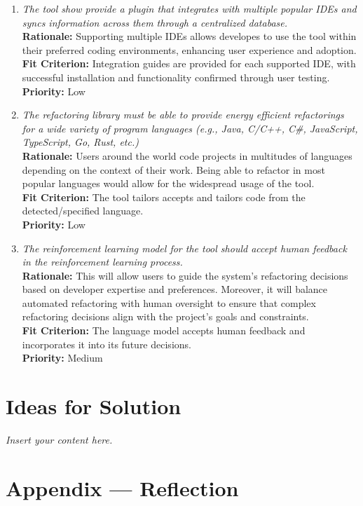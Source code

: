 \documentclass[12pt]{article}
\newcommand{\lips}{\textit{Insert your content here.}}
\begin{document}
\begin{enumerate}[label=WTRM \arabic*., wide=0pt, leftmargin=*]
    {\bf Priority:} High
  \item \emph{The tool show provide a plugin that integrates with multiple popular IDEs and syncs information across them through a centralized database.}\\
    {\bf Rationale:} Supporting multiple IDEs allows developes to use the tool within their preferred coding environments, enhancing user experience and adoption.\\
    {\bf Fit Criterion:} Integration guides are provided for each supported IDE, with successful installation and functionality confirmed through user testing.\\
    {\bf Priority:} Low
  \item \emph{The refactoring library must be able to provide energy efficient refactorings for a wide variety of program languages (e.g., Java, C/C++, C\#, JavaScript, TypeScript, Go, Rust, etc.)}\\
    {\bf Rationale:} Users around the world code projects in multitudes of languages depending on the context of their work. Being able to refactor in most popular languages would allow for the widespread usage of the tool.\\
    {\bf Fit Criterion:} The tool tailors accepts and tailors code from the detected/specified language.\\
    {\bf Priority:} Low
  \item \emph{The reinforcement learning model for the tool should accept human feedback in the reinforcement learning process.}\\
    {\bf Rationale:} This will allow users to guide the system's refactoring decisions based on developer expertise and preferences. Moreover, it will balance automated refactoring with human oversight to ensure that complex refactoring decisions align with the project's goals and constraints.\\
    {\bf Fit Criterion:} The language model accepts human feedback and incorporates it into its future decisions.\\
    {\bf Priority:} Medium
\end{enumerate}

\section{Ideas for Solution}
\lips

\newpage{}
\section*{Appendix --- Reflection}
\end{document}

